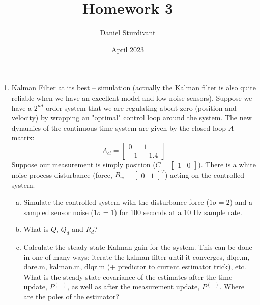 \documentclass[10pt]{article}
\author{Daniel Sturdivant}
\title{Homework 3}
\date{April 2023}
\begin{document}
\maketitle
\thispagestyle{fancy}
\setlength{\parindent}{0pt}

\begin{enumerate}[label=\textbf{\arabic*.}]
  \itemsep 24pt
  \item Kalman Filter at its best – simulation (actually the Kalman filter is 
  also quite reliable when we have an excellent model and low noise sensors). 
  Suppose we have a $2^{nd}$ order system that we are regulating about zero 
  (position and velocity) by wrapping an "optimal" control loop around the 
  system. The new dynamics of the continuous time system are given by the 
  closed-loop $A$ matrix:
  \begin{equation*}
    A_{cl} = 
    \begin{bmatrix}
      0 & 1 \\ -1 & -1.4
    \end{bmatrix}
  \end{equation*}
  Suppose our measurement is simply position ($C=\begin{bmatrix} 1 & 0 
  \end{bmatrix}$). There is a white noise process disturbance (force, $B_w = 
  \begin{bmatrix} 0 & 1 \end{bmatrix}^T$) acting on the controlled system.
  \begin{enumerate}[(a)]
    \itemsep -2pt 
    \item Simulate the controlled system with the disturbance force 
    ($1\sigma=2$) and a sampled sensor noise ($1\sigma=1$) for 100 seconds at a 
    10 Hz sample rate.

    \item What is $Q$, $Q_d$ and $R_d$?
    
    \item Calculate the steady state Kalman gain for the system. This can be 
    done in one of many ways: iterate the kalman filter until it converges, 
    dlqe.m, dare.m, kalman.m, dlqr.m (+ predictor to current estimator trick), 
    etc. What is the steady state covariance of the estimates after the time 
    update, $P^{(-)}$, as well as after the measurement update, $P^{(+)}$. 
    Where are the poles of the estimator?


\end{enumerate}
\end{enumerate}
\end{document}
